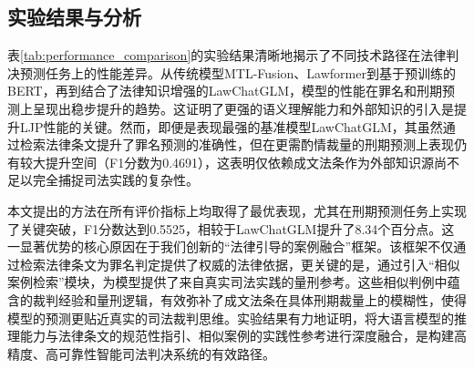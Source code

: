 \subsection{\heiti 实验结果与分析}


表\ref{tab:performance_comparison}的实验结果清晰地揭示了不同技术路径在法律判决预测任务上的性能差异。从传统模型MTL-Fusion、Lawformer到基于预训练的BERT，再到结合了法律知识增强的LawChatGLM，模型的性能在罪名和刑期预测上呈现出稳步提升的趋势。这证明了更强的语义理解能力和外部知识的引入是提升LJP性能的关键。然而，即便是表现最强的基准模型LawChatGLM，其虽然通过检索法律条文提升了罪名预测的准确性，但在更需酌情裁量的刑期预测上表现仍有较大提升空间（F1分数为0.4691），这表明仅依赖成文法条作为外部知识源尚不足以完全捕捉司法实践的复杂性。

本文提出的方法在所有评价指标上均取得了最优表现，尤其在刑期预测任务上实现了关键突破，F1分数达到0.5525，相较于LawChatGLM提升了8.34个百分点。这一显著优势的核心原因在于我们创新的“法律引导的案例融合”框架。该框架不仅通过检索法律条文为罪名判定提供了权威的法律依据，更关键的是，通过引入“相似案例检索”模块，为模型提供了来自真实司法实践的量刑参考。这些相似判例中蕴含的裁判经验和量刑逻辑，有效弥补了成文法条在具体刑期裁量上的模糊性，使得模型的预测更贴近真实的司法裁判思维。实验结果有力地证明，将大语言模型的推理能力与法律条文的规范性指引、相似案例的实践性参考进行深度融合，是构建高精度、高可靠性智能司法判决系统的有效路径。

